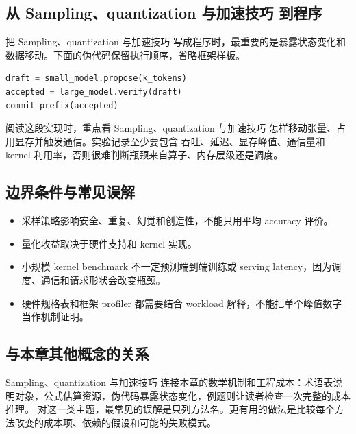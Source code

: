 \documentclass[a4paper]{article}
\begin{document}
\subsection{从 Sampling、quantization 与加速技巧 到程序}
把 Sampling、quantization 与加速技巧 写成程序时，最重要的是暴露状态变化和数据移动。下面的伪代码保留执行顺序，省略框架样板。
\begin{lstlisting}[language=Python]
draft = small_model.propose(k_tokens)
accepted = large_model.verify(draft)
commit_prefix(accepted)
\end{lstlisting}
阅读这段实现时，重点看 Sampling、quantization 与加速技巧 怎样移动张量、占用显存并触发通信。实验记录至少要包含 吞吐、延迟、显存峰值、通信量和 kernel 利用率，否则很难判断瓶颈来自算子、内存层级还是调度。
\subsection{边界条件与常见误解}
\begin{itemize}
\item 采样策略影响安全、重复、幻觉和创造性，不能只用平均 accuracy 评价。
\item 量化收益取决于硬件支持和 kernel 实现。
\item 小规模 kernel benchmark 不一定预测端到端训练或 serving latency，因为调度、通信和请求形状会改变瓶颈。
\item 硬件规格表和框架 profiler 都需要结合 workload 解释，不能把单个峰值数字当作机制证明。
\end{itemize}
\subsection{与本章其他概念的关系}
Sampling、quantization 与加速技巧 连接本章的数学机制和工程成本：术语表说明对象，公式估算资源，伪代码暴露状态变化，例题则让读者检查一次完整的成本推理。
对这一类主题，最常见的误解是只列方法名。更有用的做法是比较每个方法改变的成本项、依赖的假设和可能的失败模式。
\end{document}
